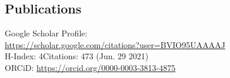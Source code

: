 \documentclass[margin,line,pifont,palatino,courier]{res}
\begin{document}
\begin{resume}
%






%


\section{\sc Publications}
	Google Scholar Profile:\\
	\url{https://scholar.google.com/citations?user=BVIO95UAAAAJ}\\
	H-Index: 4\qquad Citations: 473 (Jun. 29 2021)\\
	ORCiD: \url{https://orcid.org/0000-0003-3813-4875}


\end{resume}
\end{document}
